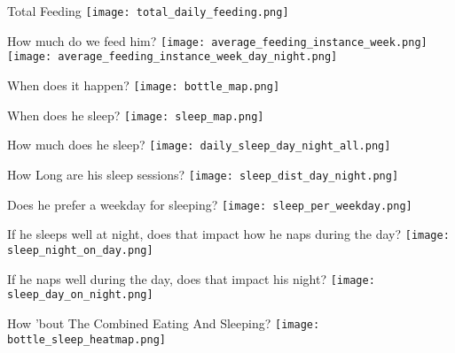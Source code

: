 \begin{frame}{Total Feeding}
\centering
\texttt{[image: total\_daily\_feeding.png]}
\end{frame}

\begin{frame}{How much do we feed him?}
\centering
    \texttt{[image: average\_feeding\_instance\_week.png]}
\hfill                      
    \texttt{[image: average\_feeding\_instance\_week\_day\_night.png]}
\end{frame}

\begin{frame}{When does it happen?}
\centering
\texttt{[image: bottle\_map.png]}
\end{frame}

\begin{frame}{When does he sleep?}
\centering
\texttt{[image: sleep\_map.png]}
\end{frame}

\begin{frame}{How much does he sleep?}
\centering
\texttt{[image: daily\_sleep\_day\_night\_all.png]}
\end{frame}

\begin{frame}{How Long are his sleep sessions?}
\centering
\texttt{[image: sleep\_dist\_day\_night.png]}
\end{frame}

\begin{frame}{Does he prefer a weekday for sleeping?}
\centering
\texttt{[image: sleep\_per\_weekday.png]}
\end{frame}

\begin{frame}{If he sleeps well at night, does that impact how he naps during the day?}
\centering
\texttt{[image: sleep\_night\_on\_day.png]}
\end{frame}

\begin{frame}{If he naps well during the day, does that impact his night?}
\centering
\texttt{[image: sleep\_day\_on\_night.png]}
\end{frame}

\begin{frame}{How 'bout The Combined Eating And Sleeping?}
\centering
\texttt{[image: bottle\_sleep\_heatmap.png]}
\end{frame}


